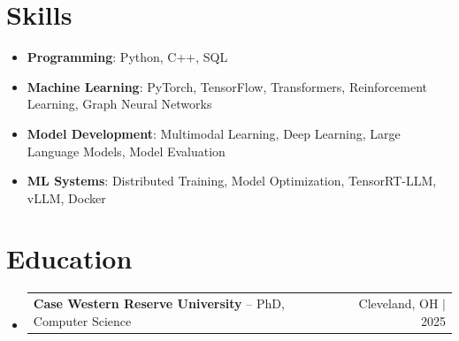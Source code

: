 \documentclass[letterpaper,13pt]{article}
\makeatletter
\newcommand{\resumeProjectHeading}[2]{
    \item
    \begin{tabular*}{\textwidth}{l@{\extracolsep{\fill}}r}
      \small#1 & #2 \\
    \end{tabular*}\vspace{-4pt}
}
\newcommand{\resumeSubHeadingListStart}{\begin{itemize}[leftmargin=0in, label={}]}
\newcommand{\resumeSubHeadingListEnd}{\end{itemize}}
\makeatother
\begin{document}
\section{Skills}
\vspace{0.02cm}
\begin{itemize}[leftmargin=0.15in, label={}, itemsep=2pt, topsep=1pt]
  \item \textbf{Programming}: Python, C++, SQL
  \item \textbf{Machine Learning}: PyTorch, TensorFlow, Transformers, Reinforcement Learning, Graph Neural Networks
  \item \textbf{Model Development}: Multimodal Learning, Deep Learning, Large Language Models, Model Evaluation
  \item \textbf{ML Systems}: Distributed Training, Model Optimization, TensorRT-LLM, vLLM, Docker
\end{itemize}
\vspace{0.02cm}

\section{Education}
\resumeSubHeadingListStart
  \resumeProjectHeading{\textbf{Case Western Reserve University} -- PhD, Computer Science}{Cleveland, OH $|$ 2025}
\resumeSubHeadingListEnd
\end{document}
